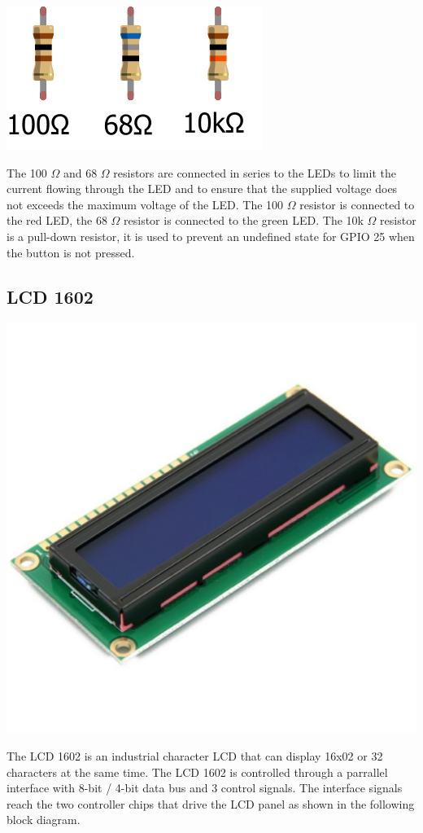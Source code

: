 \documentclass[]{article}
\begin{document}
\begin{center}
    \includegraphics{resistors}
\end{center}
The 100 $ \Omega $ and 68 $ \Omega $ resistors are connected in series to the LEDs to limit the current flowing through the LED and to ensure that the supplied 
voltage does not exceeds the maximum voltage of the LED. The 100 $ \Omega $ resistor is connected to the red LED, the 68 $ \Omega $ 
resistor is connected to the green LED.
The 10k $ \Omega $ resistor is a pull-down resistor, it is used to prevent an undefined state for GPIO 25 when the button is not pressed.

\subsection{LCD 1602}

\begin{center}
    \includegraphics[scale=0.2]{lcd}
\end{center}
The LCD 1602 is an industrial character LCD that can display 16x02 or 32 characters at the same time. 
The LCD 1602 is controlled through a parrallel interface with 8-bit / 4-bit data bus and 3 control signals. 
The interface signals reach the two controller chips that drive the LCD panel as shown in the following block diagram.
\end{document}
